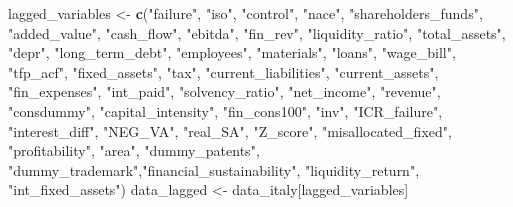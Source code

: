 \documentclass[]{article}
\newenvironment{Shaded}{\begin{snugshade}}{\end{snugshade}}
\newcommand{\KeywordTok}[1]{\textcolor[rgb]{0.13,0.29,0.53}{\textbf{#1}}}
\newcommand{\NormalTok}[1]{#1}
\newcommand{\StringTok}[1]{\textcolor[rgb]{0.31,0.60,0.02}{#1}}
\begin{document}
\begin{Shaded}
\begin{Highlighting}[]
\NormalTok{lagged_variables <-}\StringTok{ }\KeywordTok{c}\NormalTok{(}\StringTok{"failure"}\NormalTok{, }\StringTok{"iso"}\NormalTok{, }\StringTok{"control"}\NormalTok{, }\StringTok{"nace"}\NormalTok{,}
                      \StringTok{"shareholders_funds"}\NormalTok{, }\StringTok{"added_value"}\NormalTok{,}
                      \StringTok{"cash_flow"}\NormalTok{, }\StringTok{"ebitda"}\NormalTok{, }\StringTok{"fin_rev"}\NormalTok{,}
                      \StringTok{"liquidity_ratio"}\NormalTok{, }\StringTok{"total_assets"}\NormalTok{,}
                      \StringTok{"depr"}\NormalTok{, }\StringTok{"long_term_debt"}\NormalTok{, }\StringTok{"employees"}\NormalTok{,}
                      \StringTok{"materials"}\NormalTok{, }\StringTok{"loans"}\NormalTok{, }\StringTok{"wage_bill"}\NormalTok{,}
                      \StringTok{"tfp_acf"}\NormalTok{, }\StringTok{"fixed_assets"}\NormalTok{, }\StringTok{"tax"}\NormalTok{,}
                      \StringTok{"current_liabilities"}\NormalTok{, }\StringTok{"current_assets"}\NormalTok{,}
                      \StringTok{"fin_expenses"}\NormalTok{, }\StringTok{"int_paid"}\NormalTok{,}
                      \StringTok{"solvency_ratio"}\NormalTok{, }\StringTok{"net_income"}\NormalTok{,}
                      \StringTok{"revenue"}\NormalTok{, }\StringTok{"consdummy"}\NormalTok{, }\StringTok{"capital_intensity"}\NormalTok{,}
                      \StringTok{"fin_cons100"}\NormalTok{, }\StringTok{"inv"}\NormalTok{, }\StringTok{"ICR_failure"}\NormalTok{,}
                      \StringTok{"interest_diff"}\NormalTok{, }\StringTok{"NEG_VA"}\NormalTok{, }\StringTok{"real_SA"}\NormalTok{,}
                      \StringTok{"Z_score"}\NormalTok{, }\StringTok{"misallocated_fixed"}\NormalTok{,}
                      \StringTok{"profitability"}\NormalTok{, }\StringTok{"area"}\NormalTok{, }\StringTok{"dummy_patents"}\NormalTok{,}
                      \StringTok{"dummy_trademark"}\NormalTok{,}\StringTok{"financial_sustainability"}\NormalTok{,}
                      \StringTok{"liquidity_return"}\NormalTok{, }\StringTok{"int_fixed_assets"}\NormalTok{)}
\NormalTok{data_lagged <-}\StringTok{ }\NormalTok{data_italy[lagged_variables]}


\end{Highlighting}
\end{Shaded}
\end{document}
